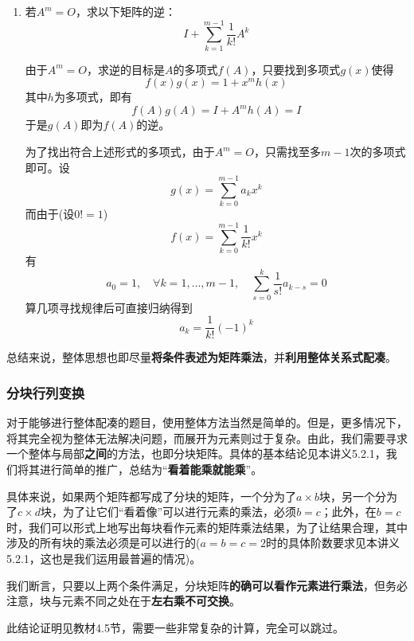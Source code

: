 \documentclass[a4paper,UTF8,fontset=windows]{ctexart}
\newcommand*{\note}{\noindent *}
\begin{document}
\begin{enumerate}
    \item 若$A^m=O$，求以下矩阵的逆：
    $$I+\sum_{k=1}^{m-1}\frac{1}{k!}A^k$$

    由于$A^m=O$，求逆的目标是$A$的多项式$f(A)$，只要找到多项式$g(x)$使得$$f(x)g(x)=1+x^mh(x)$$
    其中$h$为多项式，即有
    $$f(A)g(A)=I+A^mh(A)=I$$
    于是$g(A)$即为$f(A)$的逆。

    为了找出符合上述形式的多项式，由于$A^m=O$，只需找至多$m-1$次的多项式即可。设
    $$g(x)=\sum_{k=0}^{m-1}a_kx^k$$
    而由于(设$0!=1$)
    $$f(x)=\sum_{k=0}^{m-1}\frac{1}{k!}x^k$$
    有
    $$a_0=1,\quad\forall k=1,\dots,m-1,\quad\sum_{s=0}^k\frac{1}{s!}a_{k-s}=0$$
    算几项寻找规律后可直接归纳得到
    $$a_k=\frac{1}{k!}(-1)^k$$
\end{enumerate}

总结来说，整体思想也即尽量\textbf{将条件表述为矩阵乘法}，并\textbf{利用整体关系式配凑}。

\subsubsection{分块行列变换}
对于能够进行整体配凑的题目，使用整体方法当然是简单的。但是，更多情况下，将其完全视为整体无法解决问题，而展开为元素则过于复杂。由此，我们需要寻求一个整体与局部\textbf{之间}的方法，也即分块矩阵。具体的基本结论见本讲义5.2.1，我们将其进行简单的推广，总结为``\textbf{看着能乘就能乘}''。

具体来说，如果两个矩阵都写成了分块的矩阵，一个分为了$a\times b$块，另一个分为了$c\times d$块，为了让它们``看着像''可以进行元素的乘法，必须$b=c$；此外，在$b=c$时，我们可以形式上地写出每块看作元素的矩阵乘法结果，为了让结果合理，其中涉及的所有块的乘法必须是可以进行的($a=b=c=2$时的具体阶数要求见本讲义5.2.1，这也是我们运用最普遍的情况)。

我们断言，只要以上两个条件满足，分块矩阵\textbf{的确可以看作元素进行乘法}，但务必注意，块与元素不同之处在于\textbf{左右乘不可交换}。

\note 此结论证明见教材4.5节，需要一些非常复杂的计算，完全可以跳过。
\end{document}
